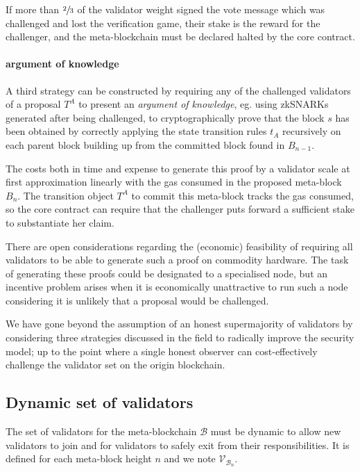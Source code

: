 \documentclass[12pt,a4paper]{article}
\begin{document}
If more than $\sfrac{2}{3}$ of the validator weight signed the vote message which was challenged and lost the verification game, their stake is the reward for the challenger, and the meta-blockchain must be declared halted by the core contract.

\paragraph{argument of knowledge} A third strategy can be constructed by requiring any of the challenged validators of a proposal $T^A$ to present an \emph{argument of knowledge}, eg. using \mbox{zkSNARKs} generated after being challenged, to cryptographically prove that the block $s$ has been obtained by correctly applying the state transition rules $t_A$ recursively on each parent block building up from the committed block found in $B_{n-1}$.

The costs both in time and expense to generate this proof by a validator scale at first approximation linearly with the gas consumed in the proposed meta-block $B_n$.
The transition object $T^A$ to commit this meta-block tracks the gas consumed, so the core contract can require that the challenger puts forward a sufficient stake to substantiate her claim.

There are open considerations regarding the (economic) feasibility of requiring all validators to be able to generate such a proof on commodity hardware.
The task of generating these proofs could be designated to a specialised node, but an incentive problem arises when it is economically unattractive to run such a node considering it is unlikely that a proposal would be challenged.

We have gone beyond the assumption of an honest supermajority of validators by considering three strategies discussed in the field to radically improve the security model; up to the point where a single honest observer can cost-effectively challenge the validator set on the origin blockchain.


\subsection{Dynamic set of validators}

The set of validators for the meta-blockchain $\mathcal{B}$ must be dynamic to allow new validators to join and for validators to safely exit from their responsibilities.
It is defined for each meta-block height $n$ and we note $\mathcal{V}_{\mathcal{B}_n}$.
\end{document}
